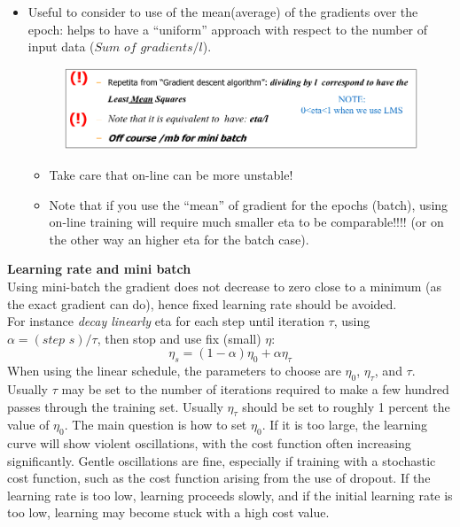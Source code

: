 \documentclass[../main.tex]{subfiles}
\begin{document}
\begin{itemize}
    \item Useful to consider to use of the mean(average) of the gradients over the epoch: helps to have a “uniform” approach with respect to the number of input data ($Sum\,\, of\,\, gradients/l$).
    \begin{figure}[H]
        \centering
        \includegraphics[scale = 0.34]{lectures/4_neural_networks/4_eta_hints.png}
        \label{fig:4_eta_hints}
    \end{figure}
    \begin{itemize}
        \item Take care that on-line can be more unstable!
        \item Note that if you use the “mean” of gradient for the epochs (batch), using on-line training will require much smaller eta to be comparable!!!! (or on the other way an higher eta for the batch case).
    \end{itemize}
    
\end{itemize}

\noindent \textbf{Learning rate and mini batch}\\
Using mini-batch the gradient does not decrease to zero close to a minimum (as the exact gradient can do), hence fixed learning rate should be avoided.\\
For instance \emph{decay linearly} eta for each step until iteration $\tau$, using $\alpha = (step\,\, s)/\tau$, then stop and use fix (small) $\eta$:
$$\eta_s = (1-\alpha)\eta_0 + \alpha \eta_\tau$$
When using the linear schedule, the parameters to choose are $\eta_0$, $\eta_\tau$, and $\tau$. Usually $\tau$ may be set to the number of iterations required to make a few hundred passes through the training set. Usually $\eta_\tau$ should be set to roughly 1 percent the value of $\eta_0$. The main question is how to set $\eta_0$. If it is too large, the learning curve will show violent oscillations, with the cost function often increasing significantly. Gentle oscillations are fine, especially if training with a stochastic cost function, such as the cost function arising from the use of dropout. If the learning rate is too low, learning proceeds slowly, and if the initial learning rate is too low, learning may become stuck with a high cost value.
\end{document}
